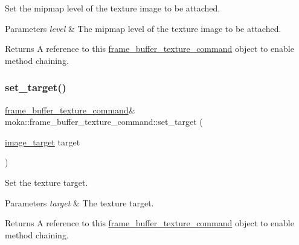 Set the mipmap level of the texture image to be attached. 


\begin{DoxyParams}{Parameters}
{\em level} & The mipmap level of the texture image to be attached. \\
\hline
\end{DoxyParams}
\begin{DoxyReturn}{Returns}
A reference to this \mbox{\hyperlink{classmoka_1_1frame__buffer__texture__command}{frame\+\_\+buffer\+\_\+texture\+\_\+command}} object to enable method chaining. 
\end{DoxyReturn}
\mbox{\label{classmoka_1_1frame__buffer__texture__command_a8a3e58975b0fcdbfc4ad1119cfbeb51d}} 
\subsubsection{\texorpdfstring{set\_target()}{set\_target()}}
{\footnotesize\ttfamily \mbox{\hyperlink{classmoka_1_1frame__buffer__texture__command}{frame\+\_\+buffer\+\_\+texture\+\_\+command}}\& moka\+::frame\+\_\+buffer\+\_\+texture\+\_\+command\+::set\+\_\+target (\begin{DoxyParamCaption}\item[{\mbox{\hyperlink{namespacemoka_a6f402ae62a72ce17ff73fa94d526800e}{image\+\_\+target}}}]{target }\end{DoxyParamCaption})}



Set the texture target. 


\begin{DoxyParams}{Parameters}
{\em target} & The texture target. \\
\hline
\end{DoxyParams}
\begin{DoxyReturn}{Returns}
A reference to this \mbox{\hyperlink{classmoka_1_1frame__buffer__texture__command}{frame\+\_\+buffer\+\_\+texture\+\_\+command}} object to enable method chaining. 
\end{DoxyReturn}
\mbox{\label{classmoka_1_1frame__buffer__texture__command_a93fffc45f26b679fd50f139c8dbc3a7d}} 
